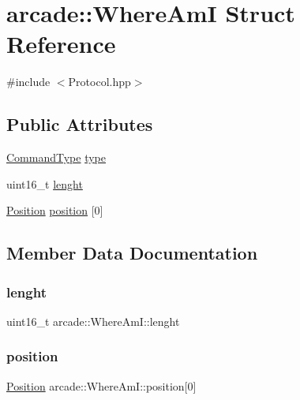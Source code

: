 \hypertarget{structarcade_1_1_where_am_i}{}\section{arcade\+:\+:Where\+AmI Struct Reference}
\label{structarcade_1_1_where_am_i}


{\ttfamily \#include $<$Protocol.\+hpp$>$}

\subsection*{Public Attributes}
\begin{DoxyCompactItemize}
\item 
\hyperlink{namespacearcade_a23d58aed7310b22b59e2b8f8ff8a5ffd}{Command\+Type} \hyperlink{structarcade_1_1_where_am_i_a566284e4a60ce85a0e899da77d13984d}{type}
\item 
uint16\+\_\+t \hyperlink{structarcade_1_1_where_am_i_a06592a4f9ac45feacc13c3792424b493}{lenght}
\item 
\hyperlink{structarcade_1_1_position}{Position} \hyperlink{structarcade_1_1_where_am_i_a0a3d3fd39432c3e7c1ffd03d04f07771}{position} \mbox{[}0\mbox{]}
\end{DoxyCompactItemize}


\subsection{Member Data Documentation}
\mbox{\label{structarcade_1_1_where_am_i_a06592a4f9ac45feacc13c3792424b493}} 
\subsubsection{\texorpdfstring{lenght}{lenght}}
{\footnotesize\ttfamily uint16\+\_\+t arcade\+::\+Where\+Am\+I\+::lenght}

\mbox{\label{structarcade_1_1_where_am_i_a0a3d3fd39432c3e7c1ffd03d04f07771}} 
\subsubsection{\texorpdfstring{position}{position}}
{\footnotesize\ttfamily \hyperlink{structarcade_1_1_position}{Position} arcade\+::\+Where\+Am\+I\+::position\mbox{[}0\mbox{]}}


